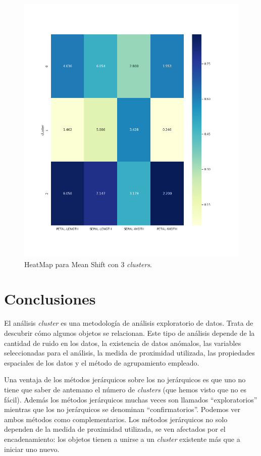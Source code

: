 \documentclass[a4paper, 20pt]{article}
\begin{document}
{\begin{figure}[h]
\centering
\includegraphics[scale=0.62]{dani/heatmapMeanShiftIRIS.png}
\caption{HeatMap para Mean Shift con 3 \textit{clusters}.}
\label{hmms}
\end{figure}

\clearpage

\section{Conclusiones}
El análisis \textit{cluster} es una metodología de análisis exploratorio de datos. Trata de descubrir cómo algunos objetos se relacionan. Este tipo de análisis depende de la cantidad de ruido en los datos, la existencia de datos anómalos, las variables seleccionadas para el análisis, la medida de proximidad utilizada, las propiedades espaciales de los datos y el método de agrupamiento empleado.

Una ventaja de los métodos jerárquicos sobre los no jerárquicos es que uno no tiene que saber de antemano el número de \textit{clusters} (que hemos visto que no es fácil). Además los métodos jerárquicos muchas veces son llamados ``exploratorios'' mientras que los no jerárquicos se denominan ``confirmatorios''. Podemos ver ambos métodos como complementarios. Los métodos jerárquicos no solo dependen de la medida de proximidad utilizada, se ven afectados por el encadenamiento: los objetos tienen a unirse a un \textit{cluster} existente más que a iniciar uno nuevo.

}
\end{document}
